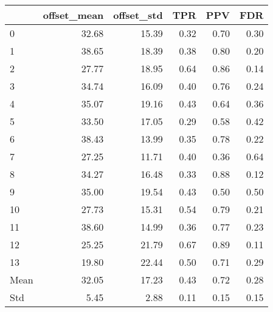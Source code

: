 \begin{tabular}{lrrrrr}
\toprule
{} &  offset\_mean &  offset\_std &   TPR &   PPV &   FDR \\
\midrule
0    &        32.68 &       15.39 &  0.32 &  0.70 &  0.30 \\
1    &        38.65 &       18.39 &  0.38 &  0.80 &  0.20 \\
2    &        27.77 &       18.95 &  0.64 &  0.86 &  0.14 \\
3    &        34.74 &       16.09 &  0.40 &  0.76 &  0.24 \\
4    &        35.07 &       19.16 &  0.43 &  0.64 &  0.36 \\
5    &        33.50 &       17.05 &  0.29 &  0.58 &  0.42 \\
6    &        38.43 &       13.99 &  0.35 &  0.78 &  0.22 \\
7    &        27.25 &       11.71 &  0.40 &  0.36 &  0.64 \\
8    &        34.27 &       16.48 &  0.33 &  0.88 &  0.12 \\
9    &        35.00 &       19.54 &  0.43 &  0.50 &  0.50 \\
10   &        27.73 &       15.31 &  0.54 &  0.79 &  0.21 \\
11   &        38.60 &       14.99 &  0.36 &  0.77 &  0.23 \\
12   &        25.25 &       21.79 &  0.67 &  0.89 &  0.11 \\
13   &        19.80 &       22.44 &  0.50 &  0.71 &  0.29 \\
Mean &        32.05 &       17.23 &  0.43 &  0.72 &  0.28 \\
Std  &         5.45 &        2.88 &  0.11 &  0.15 &  0.15 \\
\bottomrule
\end{tabular}

